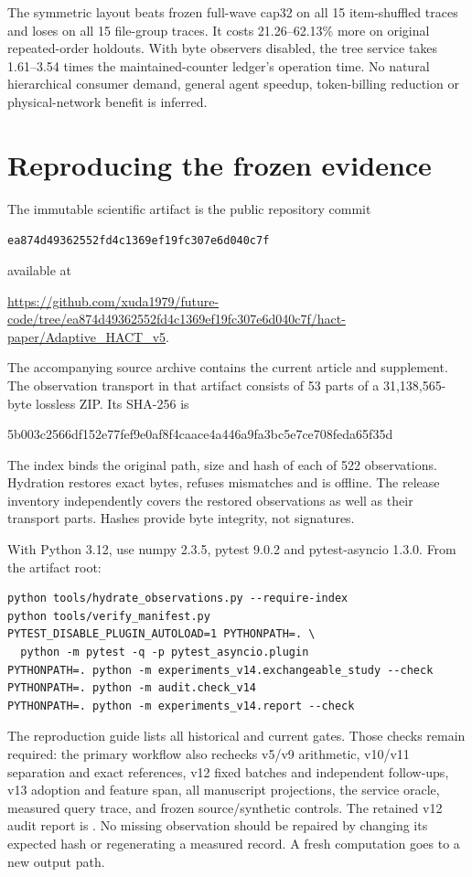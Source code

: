 \documentclass[10pt,letterpaper]{article}
\begin{document}
The symmetric layout beats frozen full-wave cap32 on all 15 item-shuffled
traces and loses on all 15 file-group traces. It costs 21.26--62.13\%
more on original repeated-order holdouts. With byte observers disabled,
the tree service takes 1.61--3.54 times the maintained-counter ledger's
operation time. No natural hierarchical consumer demand, general agent
speedup, token-billing reduction or physical-network benefit is inferred.

\section{Reproducing the frozen evidence}
The immutable scientific artifact is the public repository commit
\begin{center}\small
\texttt{ea874d49362552fd4c1369ef19fc307e6d040c7f}
\end{center}
available at
\begin{center}\small
\url{https://github.com/xuda1979/future-code/tree/ea874d49362552fd4c1369ef19fc307e6d040c7f/hact-paper/Adaptive_HACT_v5}.
\end{center}
The accompanying source archive contains the current article and supplement.
The observation transport in that artifact consists of 53 parts of a
31,138,565-byte lossless ZIP. Its SHA-256 is
\begin{center}\small\ttfamily
5b003c2566df152e77fef9e0af8f4caace4a446a9fa3bc5e7ce708feda65f35d
\end{center}
The index binds the original path, size and hash of each of 522 observations.
Hydration restores exact bytes, refuses mismatches and is offline.
The release inventory independently covers the restored observations as well
as their transport parts. Hashes provide byte integrity, not signatures.

With Python 3.12, use numpy 2.3.5, pytest 9.0.2 and pytest-asyncio 1.3.0.
From the artifact root:
\begin{verbatim}
python tools/hydrate_observations.py --require-index
python tools/verify_manifest.py
PYTEST_DISABLE_PLUGIN_AUTOLOAD=1 PYTHONPATH=. \
  python -m pytest -q -p pytest_asyncio.plugin
PYTHONPATH=. python -m experiments_v14.exchangeable_study --check
PYTHONPATH=. python -m audit.check_v14
PYTHONPATH=. python -m experiments_v14.report --check
\end{verbatim}
The reproduction guide lists all historical and current gates. Those checks
remain required: the primary workflow also rechecks v5/v9 arithmetic,
v10/v11 separation and exact references, v12 fixed batches and independent
follow-ups, v13 adoption and feature span, all manuscript projections,
the service oracle, measured query trace, and frozen source/synthetic
controls. The retained v12 audit report is
.
No missing observation should be repaired by changing its expected hash or
regenerating a measured record. A fresh computation goes to a new output path.
\end{document}
